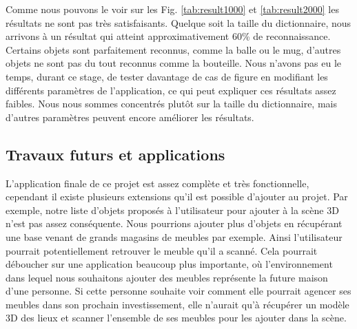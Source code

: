 Comme nous pouvons le voir sur les Fig. \ref{tab:result1000} et \ref{tab:result2000} les résultats ne sont pas très 
satisfaisants. Quelque soit la taille du dictionnaire, nous arrivons à un résultat qui atteint approximativement 60\%
de reconnaissance. Certains objets sont parfaitement reconnus, comme la balle ou le mug, d'autres objets ne sont pas du tout 
reconnus comme la bouteille. Nous n'avons pas eu le temps, durant ce stage, de tester davantage de cas de figure en modifiant les différents 
paramètres de l'application, ce qui peut expliquer ces résultats assez faibles. Nous nous sommes concentrés plutôt sur la taille
du dictionnaire, mais d'autres paramètres peuvent encore améliorer les résultats.

\subsection{Travaux futurs et applications}
L'application finale de ce projet est assez complète et très fonctionnelle, cependant il existe plusieurs extensions qu'il 
est possible d'ajouter au projet. Par exemple, notre liste d'objets proposés à l'utilisateur pour ajouter à la 
scène 3D n'est pas assez conséquente. Nous pourrions ajouter plus d'objets en récupérant une base venant de grands magasins
de meubles par exemple. Ainsi l'utilisateur pourrait potentiellement retrouver le meuble qu'il a scanné. Cela pourrait
déboucher sur une application beaucoup plus importante, où l'environnement dans lequel nous souhaitons ajouter des meubles
représente la future maison d'une personne. Si cette personne souhaite voir comment elle pourrait agencer ses meubles dans 
son prochain investissement, elle n'aurait qu'à récupérer un modèle 3D des lieux et scanner l'ensemble de ses meubles pour
les ajouter dans la scène.
